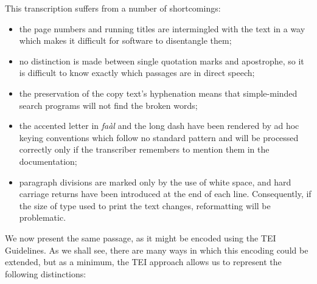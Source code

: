 \documentclass[11pt,twoside]{article}\makeatletter
\begin{document}
\par This transcription suffers from a number of shortcomings:
\begin{itemize}

\item the page numbers and running titles are intermingled with the
text in a way which makes it difficult for software to disentangle
them;
\item no distinction is made between single quotation marks and
apostrophe, so it is difficult to know exactly which passages are in
direct speech;
\item the preservation of the copy text's hyphenation means that
simple-minded search programs will not find the broken words;
\item the accented letter in \emph{faàl} and
the long dash have been rendered by ad hoc keying conventions which
follow no standard pattern and will be processed correctly only if the
transcriber remembers to mention them in the documentation;
\item paragraph divisions are marked only by the use of white space,
and hard carriage returns have been introduced at the end of each
line. Consequently, if the size of type used to print the text
changes, reformatting will be problematic.
\end{itemize} \par We now present the same passage, as it might be encoded using the
TEI Guidelines. As we shall see, there are many ways in which this
encoding could be extended, but as a minimum, the TEI approach allows
us to represent the following distinctions:
\end{document}
